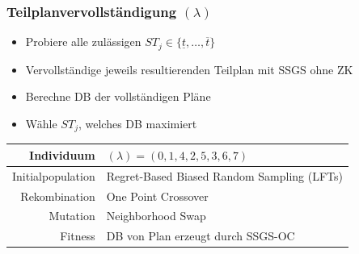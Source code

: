\begin{frame}
	\frametitle{Teilplanvervollständigung $(\lambda)$}
	\begin{itemize}
		\item Probiere alle zulässigen $ST_j \in \{ \underline{t}, \ldots, \overline{t} \}$
		\item Vervollständige jeweils resultierenden Teilplan mit SSGS ohne ZK
		\item Berechne DB der vollständigen Pläne
		\item Wähle $ST_j$, welches DB maximiert
	\end{itemize}
	\begin{small}
		\begin{center}
			\begin{tabular}{rl}
				\hline 
				Individuum & $(\lambda)=(0,1,4,2,5,3,6,7)$\parbox[c][40pt][c]{0pt}{}\tabularnewline
				\hline 
				Initialpopulation & Regret-Based Biased Random Sampling (LFTs)\tabularnewline
				\hline 
				Rekombination & One Point Crossover\tabularnewline
				\hline 
				Mutation & Neighborhood Swap\tabularnewline
				\hline 
				Fitness & DB von Plan erzeugt durch SSGS-OC\tabularnewline
				\hline 
			\end{tabular}
		\end{center}
	\end{small}
\end{frame}

